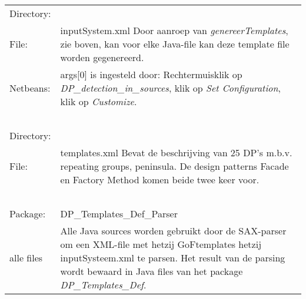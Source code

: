 \documentclass[12pt,a4paper]{report}
\begin{document}
\begin{flushleft}
\begin{tabular} {l p{12cm}}
Directory:   & \\
File:        & inputSystem.xml \newline 
               Door aanroep van \emph{genereerTemplates}, zie boven,  kan voor elke Java-file
               kan deze template file worden gegenereerd. \\
Netbeans:    & args[0] is ingesteld door: \newline
               Rechtermuisklik op \emph{DP\_detection\_in\_sources},
               klik op \emph{Set Configuration}, klik op  \emph{Customize}. \\
\ \\
Directory:   & \\
File:        & templates.xml  \newline
               Bevat de beschrijving van 25 DP's m.b.v. repeating groups, peninsula. \newline
               De design patterns Facade en Factory Method komen beide twee keer voor. \\
\ \\            
Package:     & DP\_Templates\_Def\_Parser \\
alle files   & Alle Java sources worden gebruikt door de SAX-parser om een XML-file met \newline
               hetzij  GoF\-templates  hetzij inputSysteem.xml te parsen. \newline
               Het result van de parsing wordt bewaard in Java files van het package 
               \emph{DP\_Templates\_Def}.
\end{tabular}
\end{flushleft}
\end{document}
